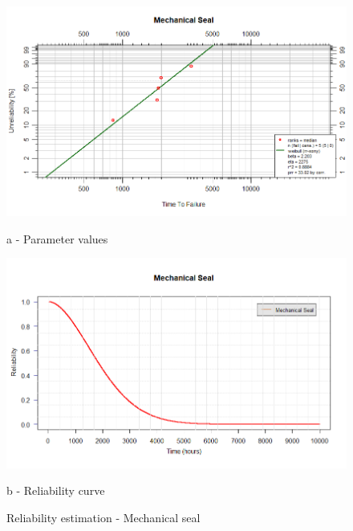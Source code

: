 \begin{figure}[!htb]
	\begin{minipage}[b]{0.5\linewidth}
		\centering
		\includegraphics[width=\textwidth]{figures/ch05_fig_reliability_mechseal_parameter}
		\caption*{a - Parameter values}
	\end{minipage}
	\hspace{0.05cm}
	\begin{minipage}[b]{0.5\linewidth}
		\centering
		\includegraphics[width=\textwidth]{figures/ch05_fig_reliability_mechseal_curve}
		\caption*{b - Reliability curve}
	\end{minipage}
	\caption{Reliability estimation - Mechanical seal}
	\label{ch05_fig_reliability_mechseal}
\end{figure}